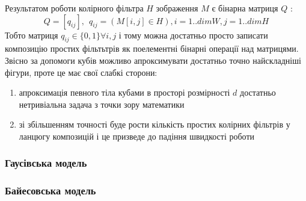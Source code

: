 Результатом роботи колірного фільтра $H$ зображення $M$ є бінарна матриця $Q$ :
\begin{equation}
	\label{eq:simple_color_filter_result}
	Q = [q_{ij}], \:\: q_{ij} = ( M[i,j] \in H ), i=1..dimW, j=1..dimH
\end{equation}
Тобто матриця $q_{ij} \in \{0,1\} \forall i,j$ і тому можна достатньо просто записати композицію простих фільтьтрів як поелементні бінарні операції над матрицями. Звісно за допомоги кубів можливо апроксимувати достатньо точно найскладніші фігури, проте це має свої слабкі сторони:
\begin{enumerate}
	\item апроксимація певного тіла кубами в просторі розмірності $d$ достатньо нетривіальна задача з точки зору математики
	\item зі збільшенням точності буде рости кількість простих колірних фільтрів у ланцюгу композицій і це призведе до падіння швидкості роботи
\end{enumerate}

\subsubsection{Гаусівська модель}

\subsubsection{Байесовська модель}
